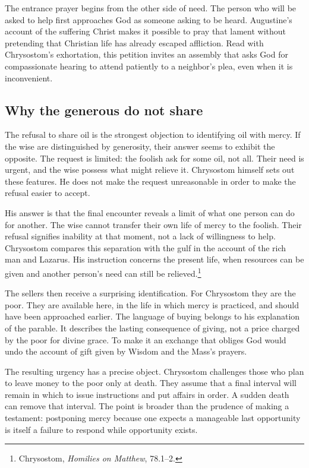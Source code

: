 The entrance prayer begins from the other side of need. The person who will be asked to help first approaches God as someone asking to be heard. Augustine's account of the suffering Christ makes it possible to pray that lament without pretending that Christian life has already escaped affliction. Read with Chrysostom's exhortation, this petition invites an assembly that asks God for compassionate hearing to attend patiently to a neighbor's plea, even when it is inconvenient.

\subsection{Why the generous do not share}
The refusal to share oil is the strongest objection to identifying oil with mercy. If the wise are distinguished by generosity, their answer seems to exhibit the opposite. The request is limited: the foolish ask for some oil, not all. Their need is urgent, and the wise possess what might relieve it. Chrysostom himself sets out these features. He does not make the request unreasonable in order to make the refusal easier to accept.

His answer is that the final encounter reveals a limit of what one person can do for another. The wise cannot transfer their own life of mercy to the foolish. Their refusal signifies inability at that moment, not a lack of willingness to help. Chrysostom compares this separation with the gulf in the account of the rich man and Lazarus. His instruction concerns the present life, when resources can be given and another person's need can still be relieved.\footnote{Chrysostom, \textit{Homilies on Matthew}, 78.1--2.}

The sellers then receive a surprising identification. For Chrysostom they are the poor. They are available here, in the life in which mercy is practiced, and should have been approached earlier. The language of buying belongs to his explanation of the parable. It describes the lasting consequence of giving, not a price charged by the poor for divine grace. To make it an exchange that obliges God would undo the account of gift given by Wisdom and the Mass's prayers.

The resulting urgency has a precise object. Chrysostom challenges those who plan to leave money to the poor only at death. They assume that a final interval will remain in which to issue instructions and put affairs in order. A sudden death can remove that interval. The point is broader than the prudence of making a testament: postponing mercy because one expects a manageable last opportunity is itself a failure to respond while opportunity exists.

